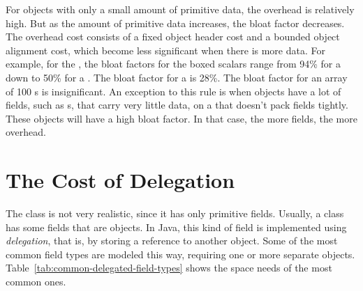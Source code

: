 
For objects with only a small amount of primitive data, the overhead is relatively high. 
But as the amount of primitive data increases, the bloat factor decreases. 
The overhead cost consists of a fixed object header cost and a bounded
object alignment cost, which become less significant when there is more data. 
For example, for the \oracle \jre, the bloat factors for the boxed scalars range from 94\%
for a  down to 50\% for a
.  The bloat factor for a  is 28\%.  The
bloat factor for an array of 100 s is insignificant.  
An exception to this rule is when objects
have a lot of fields, such as s, that carry very little data, on a 
\jre that doesn't pack fields tightly.
These objects will have a high bloat factor. In that case, the more fields, the
more overhead.

\section{The Cost of Delegation}

The  class is not very realistic, since it has only
primitive fields. Usually, a class has some fields that are objects. In Java,
this kind of field is implemented using
\textit{delegation}, that is, by storing a reference to another object. 
Some of the most common field types are modeled this way, requiring one or more
separate objects. Table~\ref{tab:common-delegated-field-types} shows the space
needs of the most common ones.


